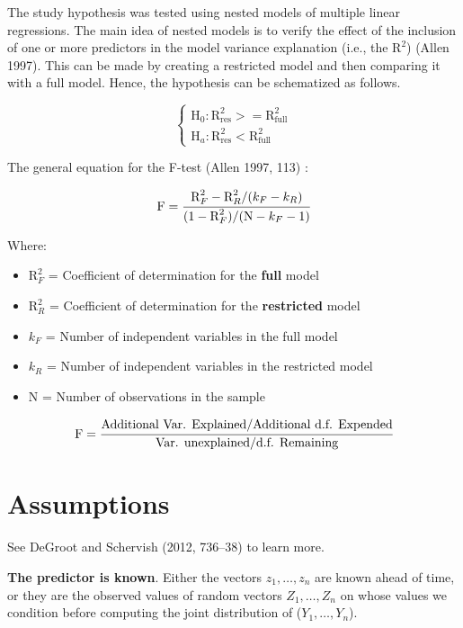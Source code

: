 \documentclass[
  12pt,
  a4paper,
  oneside]{tesesusp}
\providecommand{\tightlist}{%
  \setlength{\itemsep}{0pt}\setlength{\parskip}{0pt}}\usepackage{longtable,booktabs,array}
\begin{document}
The study hypothesis was tested using nested models of multiple linear
regressions. The main idea of nested models is to verify the effect of
the inclusion of one or more predictors in the model variance
explanation (i.e., the \(\text{R}^{2}\)) (Allen 1997). This can be made
by creating a restricted model and then comparing it with a full model.
Hence, the hypothesis can be schematized as follows.

\[
\begin{cases}
\text{H}_{0}: \text{R}^{2}_{\text{res}} >= \text{R}^{2}_{\text{full}} \\
\text{H}_{a}: \text{R}^{2}_{\text{res}} < \text{R}^{2}_{\text{full}}
\end{cases}
\]

The general equation for the F-test (Allen 1997, 113) :

\[
\text{F} = \cfrac{\text{R}^{2}_{F} - \text{R}^{2}_{R} / (k_{F} - k_{R})}{(1 - \text{R}^{2}_{F}) / (\text{N} - k_{F} - 1)}
\]

Where:

\begin{itemize}
\tightlist
\item
  \(\text{R}^{2}_{F}\) = Coefficient of determination for the
  \textbf{full} model
\item
  \(\text{R}^{2}_{R}\) = Coefficient of determination for the
  \textbf{restricted} model
\item
  \(k_{F}\) = Number of independent variables in the full model
\item
  \(k_{R}\) = Number of independent variables in the restricted model
\item
  \(\text{N}\) = Number of observations in the sample
\end{itemize}

\[
\text{F} = \cfrac{\text{Additional Var. Explained} / \text{Additional d.f. Expended}}{\text{Var. unexplained} / \text{d.f. Remaining}}
\]

\hypertarget{assumptions}{%
\section{Assumptions}\label{assumptions}}

See DeGroot and Schervish (2012, 736--38) to learn more.

\begin{tcolorbox}[enhanced jigsaw, rightrule=.15mm, colback=white, colbacktitle=quarto-callout-warning-color!10!white, toptitle=1mm, bottomtitle=1mm, toprule=.15mm, bottomrule=.15mm, colframe=quarto-callout-warning-color-frame, opacitybacktitle=0.6, opacityback=0, coltitle=black, left=2mm, breakable, titlerule=0mm, title=\textcolor{quarto-callout-warning-color}{\faExclamationTriangle}\hspace{0.5em}{Warning}, arc=.35mm, leftrule=.75mm]

\textbf{The predictor is known}. Either the vectors
\(z_{1}, \dots , z_{n}\) are known ahead of time, or they are the
observed values of random vectors \(Z_{1}, \dots , Z_{n}\) on whose
values we condition before computing the joint distribution of
(\(Y_{1}, \dots , Y_{n}\)).

\end{tcolorbox}
\end{document}
